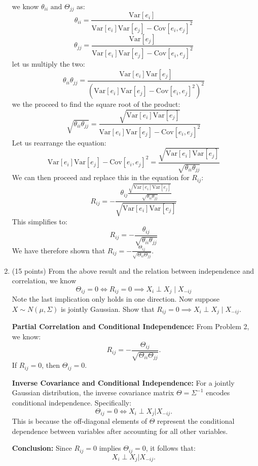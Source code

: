 \documentclass[a3paper,12pt]{extarticle} %
\begin{document}
\begin{enumerate}
\[    \]
    we know \(\theta_{ii} \text{ and } \Theta_{jj}\) as:
    \[
        \theta_{ii} = \frac{\text{Var}[e_i]}{\text{Var}[e_i] \text{Var}[e_j] - \text{Cov}[e_i, e_j]^2}
    \]
    \[
        \theta_{jj} = \frac{\text{Var}[e_j]}{\text{Var}[e_i] \text{Var}[e_j] - \text{Cov}[e_i, e_j]^2}
    \]
    let us multiply the two:
    \[
    \theta_{ii} \theta_{jj} = \frac{\text{Var}[e_i] \text{Var}[e_j]}{(\text{Var}[e_i] \text{Var}[e_j] - \text{Cov}[e_i, e_j]^2)^2}
    \]
    we the proceed to find the square root of the product:
    \[
    \sqrt{\theta_{ii} \theta_{jj}} = \frac{\sqrt{\text{Var}[e_i] \text{Var}[e_j]}}{\text{Var}[e_i] \text{Var}[e_j] - \text{Cov}[e_i, e_j]^2}
    \]
    Let us rearrange the equation:
    \[
        \text{Var}[e_i] \text{Var}[e_j] - \text{Cov}[e_i, e_j]^2 = \frac{\sqrt{\text{Var}[e_i] \text{Var}[e_j]}}{\sqrt{\theta_{ii} \theta_{jj}}}
    \]
    We can then proceed and replace this in the equation for \(R_{ij}\):
    \[
    R_{ij} = -\frac{\theta_{ij} \frac{\sqrt{\text{Var}[e_i] \text{Var}[e_j]}}{\sqrt{\theta_{ii} \theta_{jj}}}}{\sqrt{\text{Var}[e_i] \text{Var}[e_j]}}
    \]
    This simplifies to:
    \[
    R_{ij} = -\frac{\theta_{ij}}{\sqrt{\theta_{ii} \theta_{jj}}}
    \]
    We have therefore shown that \( R_{ij} = -\frac{\Theta_{ij}}{\sqrt{\Theta_{ii} \Theta_{jj}}} \).
    
    \item (15 points) From the above result and the relation between independence and correlation, we know
    \[
    \Theta_{ij} = 0 \iff R_{ij} = 0 \implies X_i \perp X_j \mid X_{-ij}
    \]
    Note the last implication only holds in one direction. Now suppose \(X \sim N(\mu, \Sigma)\) is jointly Gaussian. Show that \(R_{ij} = 0 \implies X_i \perp X_j \mid X_{-ij}\).

    \textbf{Partial Correlation and Conditional Independence:}
From Problem 2, we know:
\[
R_{ij} = -\frac{\Theta_{ij}}{\sqrt{\Theta_{ii} \Theta_{jj}}}.
\]
If \( R_{ij} = 0 \), then \( \Theta_{ij} = 0 \).

\textbf{Inverse Covariance and Conditional Independence:}
For a jointly Gaussian distribution, the inverse covariance matrix \( \Theta = \Sigma^{-1} \) encodes conditional independence. Specifically:
\[
\Theta_{ij} = 0 \iff X_i \perp X_j | X_{-ij}.
\]
This is because the off-diagonal elements of \( \Theta \) represent the conditional dependence between variables after accounting for all other variables.

\textbf{Conclusion:}
Since \( R_{ij} = 0 \) implies \( \Theta_{ij} = 0 \), it follows that:
\[
X_i \perp X_j | X_{-ij}.
\]

\end{enumerate}
\newpage
\end{document}
